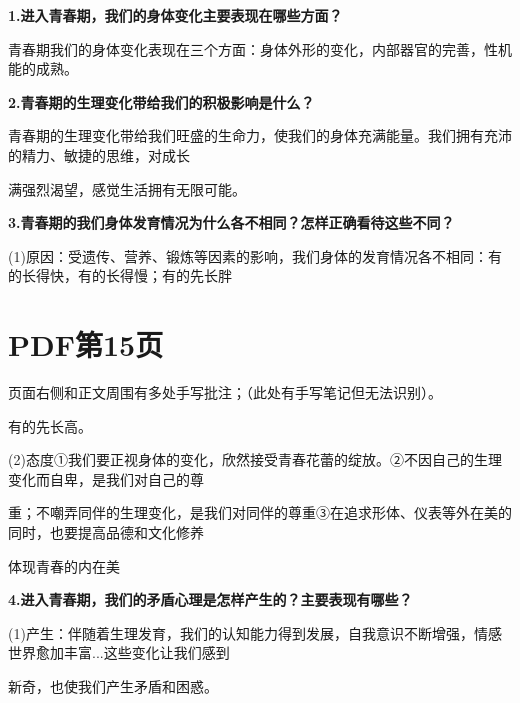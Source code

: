 \documentclass[lang=cn,11pt]{elegantbook}
\newcommand{\daofasym}[1]{{\daofasymbolfont #1}}
\newcommand{\daofasym}[1]{#1}
\begin{document}
\textbf{1.进入青春期，我们的身体变化主要表现在哪些方面？}\par

青春期我们的身体变化表现在三个方面：身体外形的变化，内部器官的完善，性机能的成熟。\par

\textbf{2.青春期的生理变化带给我们的积极影响是什么？}\par

青春期的生理变化带给我们旺盛的生命力，使我们的身体充满能量。我们拥有充沛的精力、敏捷的思维，对成长\par

满强烈渴望，感觉生活拥有无限可能。\par

\textbf{3.青春期的我们身体发育情况为什么各不相同？怎样正确看待这些不同？}\par

(1)原因：受遗传、营养、锻炼等因素的影响，我们身体的发育情况各不相同：有的长得快，有的长得慢；有的先长胖\par


\section*{PDF第15页}

\begin{note}[手写批注]
页面右侧和正文周围有多处手写批注；（此处有手写笔记但无法识别）。\par
\end{note}

有的先长高。\par

(2)态度\daofasym{①}我们要正视身体的变化，欣然接受青春花蕾的绽放。\daofasym{②}不因自己的生理变化而自卑，是我们对自己的尊\par

重；不嘲弄同伴的生理变化，是我们对同伴的尊重\daofasym{③}在追求形体、仪表等外在美的同时，也要提高品德和文化修养\par

体现青春的内在美\par

\textbf{4.进入青春期，我们的矛盾心理是怎样产生的？主要表现有哪些？}\par

(1)产生：伴随着生理发育，我们的认知能力得到发展，自我意识不断增强，情感世界愈加丰富...这些变化让我们感到\par

新奇，也使我们产生矛盾和困惑。\par
\end{document}
